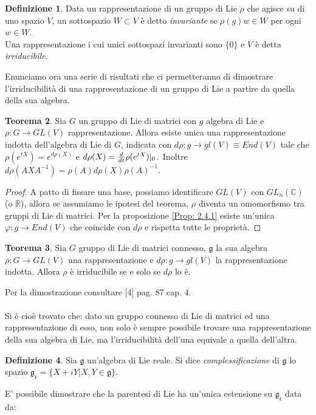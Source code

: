 \documentclass[12pt,a4paper]{report}
\theoremstyle{definition}
\newtheorem{Def}{Definizione}[chapter]
\newtheorem{Theo}[Def]{Teorema}
\theoremstyle{definition}
\theoremstyle{definition}
\theoremstyle{definition}
\begin{document}
\begin{Def}
	Data un rappresentazione di un gruppo di Lie $\rho$ che agisce su di uno spazio $V$, un sottospazio $W\subset V$ è detto \textit{invariante} se $\rho(g)w\in W$ per ogni $w\in W$.\\
	Una rappresentazione i cui unici sottospazi invarianti sono $\{0\}$ e $V$ è detta \textit{irriducibile}.
\end{Def}
Enunciamo ora una serie di risultati che ci permetteranno di dimostrare l'irriducibilità di una rappresentazione di un gruppo di Lie a partire da quella della sua algebra.
\begin{Theo}
	Sia $G$ un gruppo di Lie di matrici con $g$ algebra di Lie e $\rho:G\rightarrow GL(V)$ rappresentazione. Allora esiste unica una rappresentazione indotta dell'algebra di Lie di $G$, indicata con $d\rho:g\rightarrow gl(V)\equiv End(V)$ tale che $\rho(e^{tX})=e^{d\rho(X)}$ e $d\rho(X)={d\over dt}\rho(e^{tX})|_0$.\
	Inoltre $d\rho(AXA^{-1})=\rho(A)d\rho(X)\rho(A)^{-1}$.	
\end{Theo}
\begin{proof}
	A patto di fissare una base, possiamo identificare $GL(V)$ con $GL_n(\mathbb{C})$ (o $\mathbb{R}$), allora se assumiamo le ipotesi del teorema, $\rho$ diventa un omomorfismo tra gruppi di Lie di matrici. Per la proposizione \ref{Prop: 2.4.1} esiste un'unica $\varphi:g\rightarrow End(V)$ che coincide con $d\rho$ e rispetta tutte le proprietà.
\end{proof}
\begin{Theo}\label{Theo: 3.1}
	Sia $G$ gruppo di Lie di matrici connesso, $\mathfrak{g}$ la sua algebra $\rho:G\rightarrow GL(V)$ una rappresentazione e $d\rho:g\rightarrow gl(V)$ la rappresentazione indotta. Allora $\rho$ è irriducibile se e solo se $d\rho$ lo è.
\end{Theo}
Per la dimostrazione consultare [4] pag. 87 cap. 4.\\
\\
Si è cioè trovato che: dato un gruppo connesso di Lie di matrici ed una rappresentazione di esso, non solo è sempre possibile trovare una rappresentazione della sua algebra di Lie, ma l'irriducibilità dell'una equivale a quella dell'altra.
\begin{Def}
	Sia $\mathfrak{g}$ un'algebra di Lie reale. Si dice \textit{complessificazione} di $\mathfrak{g}$ lo spazio $\mathfrak{g_c}=\{X+iY|X,Y\in\mathfrak{g}\}$.
\end{Def}
E' possibile dimostrare che la parentesi di Lie ha un'unica estensione su $\mathfrak{g_c}$ data da:
\end{document}
